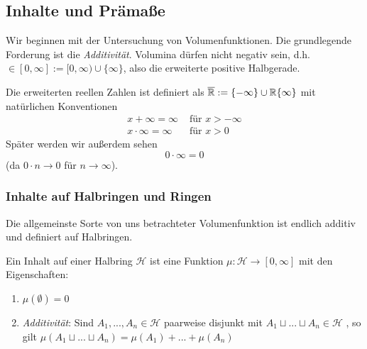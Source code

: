 \subsection{Inhalte und Prämaße}
Wir beginnen mit der Untersuchung von Volumenfunktionen. Die grundlegende Forderung ist die \emph{Additivität}. Volumina dürfen nicht negativ sein, d.h. $\in [0,\infty] := [0, \infty) \cup \{ \infty\}$, also die erweiterte positive Halbgerade. 
\begin{remark}
Die erweiterten reellen Zahlen ist definiert als $\overline{\mathbb{R}} := \{- \infty\} \cup \mathbb{R} \{ \infty \}$ mit natürlichen Konventionen
\begin{align*}
	x + \infty = \infty & \text{ für } x > - \infty	\\
	x \cdot \infty = \infty &\text{ für } x> 0
\end{align*}
Später werden wir außerdem sehen 
\begin{equation*}
	0 \cdot \infty = 0
\end{equation*}
(da $ 0 \cdot n \longrightarrow 0$ für $n \longrightarrow \infty$).
\end{remark}
\subsubsection{Inhalte auf Halbringen und Ringen}
Die allgemeinste Sorte von uns betrachteter Volumenfunktion ist endlich additiv und definiert auf Halbringen.

\begin{definition}
\begin{mdframed}
Ein Inhalt auf einer Halbring $\mathcal{H}$ ist eine Funktion $\mu: \mathcal{H} \to [0,\infty]$ mit den Eigenschaften:
\begin{enumerate}[(\roman*),topsep=5pt, itemsep = 0 pt]
	\item $\mu (\emptyset) = 0$
	\item \emph{Additivität}: Sind $A_1,...,A_n \in \mathcal{H}$ paarweise disjunkt mit $A_1 \sqcup ... \sqcup A_n \in \mathcal{H}$ , so gilt $\mu(A_1 \sqcup ... \sqcup A_n) = \mu(A_1) + ... +\mu(A_n)$
\end{enumerate}
\end{mdframed}
\end{definition}

